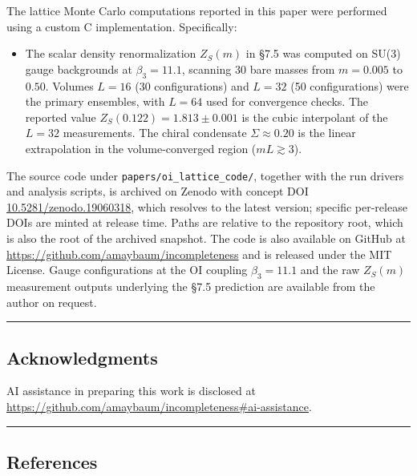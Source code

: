 \documentclass[
]{article}
\providecommand{\tightlist}{%
  \setlength{\itemsep}{0pt}\setlength{\parskip}{0pt}}
\begin{document}
The lattice Monte Carlo computations reported in this paper were
performed using a custom C implementation. Specifically:

\begin{itemize}
\tightlist
\item
  The scalar density renormalization \(Z_S(m)\) in §7.5 was computed on
  SU(3) gauge backgrounds at \(\beta_3 = 11.1\), scanning 30 bare masses
  from \(m = 0.005\) to \(0.50\). Volumes \(L = 16\) (30 configurations)
  and \(L = 32\) (50 configurations) were the primary ensembles, with
  \(L = 64\) used for convergence checks. The reported value
  \(Z_S(0.122) = 1.813 \pm 0.001\) is the cubic interpolant of the
  \(L = 32\) measurements. The chiral condensate \(\Sigma \approx 0.20\)
  is the linear extrapolation in the volume-converged region
  (\(mL \gtrsim 3\)).
\end{itemize}

The source code under \texttt{papers/oi\_lattice\_code/}, together with
the run drivers and analysis scripts, is archived on Zenodo with concept
DOI
\href{https://doi.org/10.5281/zenodo.19060318}{10.5281/zenodo.19060318},
which resolves to the latest version; specific per-release DOIs are
minted at release time. Paths are relative to the repository root, which
is also the root of the archived snapshot. The code is also available on
GitHub at \url{https://github.com/amaybaum/incompleteness} and is
released under the MIT License. Gauge configurations at the OI coupling
\(\beta_3 = 11.1\) and the raw \(Z_S(m)\) measurement outputs underlying
the §7.5 prediction are available from the author on request.

\begin{center}\rule{0.5\linewidth}{0.5pt}\end{center}

\hypertarget{acknowledgments}{%
\subsection{Acknowledgments}\label{acknowledgments}}

AI assistance in preparing this work is disclosed at\\
\url{https://github.com/amaybaum/incompleteness\#ai-assistance}.

\begin{center}\rule{0.5\linewidth}{0.5pt}\end{center}

\hypertarget{references}{%
\subsection{References}\label{references}}
\end{document}

